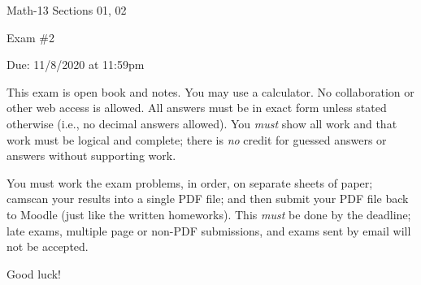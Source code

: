 \documentclass[letterpaper,12pt,fleqn]{article}
\begin{document}
\begin{center}
  \large
  Math-13 Sections 01, 02

  \Large
  Exam \#2

  Due: 11/8/2020 at 11:59pm
\end{center}

\vspace{0.5in}

This exam is open book and notes.  You may use a calculator.  No collaboration or other web access is allowed. All
answers must be in exact form unless stated otherwise (i.e., no decimal answers allowed).  You \emph{must} show all
work and that work must be logical and complete; there is \emph{no} credit for guessed answers or answers without
supporting work.

You must work the exam problems, in order, on separate sheets of paper; camscan your results into a single PDF
file; and then submit your PDF file back to Moodle (just like the written homeworks).  This \emph{must} be done by
the deadline; late exams, multiple page or non-PDF submissions, and exams sent by email will not be accepted.

Good luck!

\vspace{0.5in}
\end{document}
